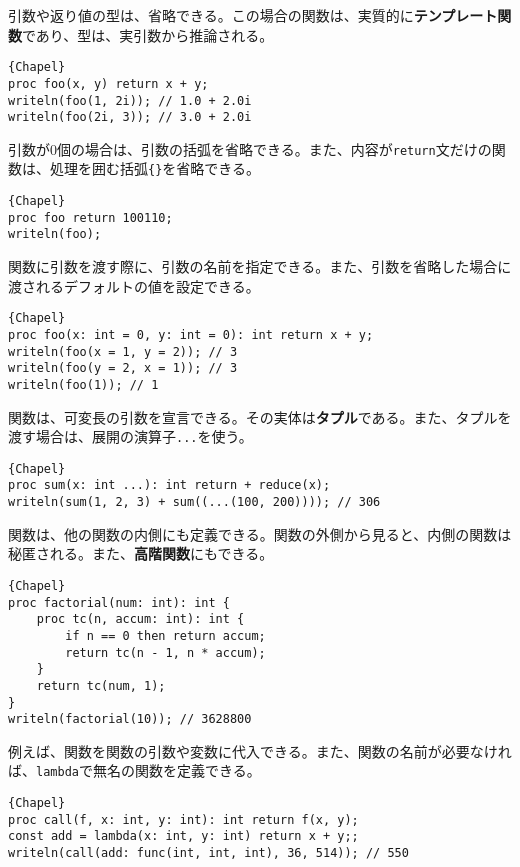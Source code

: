 \documentclass[10pt,a4paper]{book}
\begin{document}
引数や返り値の型は、省略できる。この場合の関数は、実質的に\textbf{テンプレート関数}であり、型は、実引数から推論される。

\begin{Verbatim}{Chapel}
proc foo(x, y) return x + y;
writeln(foo(1, 2i)); // 1.0 + 2.0i
writeln(foo(2i, 3)); // 3.0 + 2.0i
\end{Verbatim}

引数が0個の場合は、引数の括弧を省略できる。また、内容が\texttt{return}文だけの関数は、処理を囲む括弧\verb|{}|を省略できる。

\begin{Verbatim}{Chapel}
proc foo return 100110;
writeln(foo);
\end{Verbatim}

関数に引数を渡す際に、引数の名前を指定できる。また、引数を省略した場合に渡されるデフォルトの値を設定できる。

\begin{Verbatim}{Chapel}
proc foo(x: int = 0, y: int = 0): int return x + y;
writeln(foo(x = 1, y = 2)); // 3
writeln(foo(y = 2, x = 1)); // 3
writeln(foo(1)); // 1
\end{Verbatim}

関数は、可変長の引数を宣言できる。その実体は\textbf{タプル}である。また、タプルを渡す場合は、展開の演算子\texttt{...}を使う。

\begin{Verbatim}{Chapel}
proc sum(x: int ...): int return + reduce(x);
writeln(sum(1, 2, 3) + sum((...(100, 200)))); // 306
\end{Verbatim}

関数は、他の関数の内側にも定義できる。関数の外側から見ると、内側の関数は秘匿される。また、\textbf{高階関数}にもできる。

\begin{Verbatim}{Chapel}
proc factorial(num: int): int {
	proc tc(n, accum: int): int {
		if n == 0 then return accum;
		return tc(n - 1, n * accum);
	}
	return tc(num, 1);
}
writeln(factorial(10)); // 3628800
\end{Verbatim}

例えば、関数を関数の引数や変数に代入できる。また、関数の名前が必要なければ、\texttt{lambda}で無名の関数を定義できる。

\begin{Verbatim}{Chapel}
proc call(f, x: int, y: int): int return f(x, y);
const add = lambda(x: int, y: int) return x + y;;
writeln(call(add: func(int, int, int), 36, 514)); // 550
\end{Verbatim}
\end{document}
